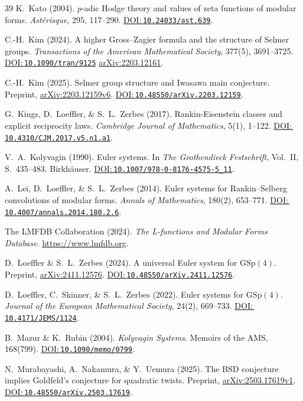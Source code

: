 \documentclass[aps,prd,twocolumn,superscriptaddress,nofootinbib,floatfix]{revtex4-2}
\newcommand{\doilink}[1]{\href{https://doi.org/#1}{DOI:\,\nolinkurl{#1}}}
\theoremstyle{definition}
\theoremstyle{remark}
\begin{document}
\begin{thebibliography}{39}
K.~Kato (2004).
$p$-adic Hodge theory and values of zeta functions of modular forms.
\textit{Astérisque}, 295, 117--290.
\doilink{10.24033/ast.639}.

C.-H.~Kim (2024).
A higher Gross--Zagier formula and the structure of Selmer groups.
\textit{Transactions of the American Mathematical Society}, 377(5), 3691--3725.
\doilink{10.1090/tran/9125} \href{https://arxiv.org/abs/2203.12161}{arXiv:2203.12161}.

C.-H.~Kim (2025).
Selmer group structure and Iwasawa main conjecture.
Preprint, \href{https://arxiv.org/abs/2203.12159v6}{arXiv:2203.12159v6}.
\doilink{10.48550/arXiv.2203.12159}.

G.~Kings, D.~Loeffler, \& S.~L.~Zerbes (2017).
Rankin-Eisenstein classes and explicit reciprocity laws.
\textit{Cambridge Journal of Mathematics}, 5(1), 1--122.
\doilink{10.4310/CJM.2017.v5.n1.a1}.

V.~A.~Kolyvagin (1990).
Euler systems.
In \textit{The Grothendieck Festschrift}, Vol.~II, S.\ 435--483. Birkhäuser.
\doilink{10.1007/978-0-8176-4575-5\_11}.

A.~Lei, D.~Loeffler, \& S.~L.~Zerbes (2014).
Euler systems for Rankin--Selberg convolutions of modular forms.
\textit{Annals of Mathematics}, 180(2), 653--771.
\doilink{10.4007/annals.2014.180.2.6}.

The LMFDB Collaboration (2024).
\textit{The L-functions and Modular Forms Database}.
\url{https://www.lmfdb.org}.

D.~Loeffler \& S.~L.~Zerbes (2024).
A universal Euler system for $\mathrm{GSp}(4)$.
Preprint, \href{https://arxiv.org/abs/2411.12576}{arXiv:2411.12576}.
\doilink{10.48550/arXiv.2411.12576}.

D.~Loeffler, C.~Skinner, \& S.~L.~Zerbes (2022).
Euler systems for $\mathrm{GSp}(4)$.
\textit{Journal of the European Mathematical Society}, 24(2), 669--733.
\doilink{10.4171/JEMS/1124}.

B.~Mazur \& K.~Rubin (2004).
\textit{Kolyvagin Systems}.
Memoirs of the AMS, 168(799).
\doilink{10.1090/memo/0799}.

N.~Murabayashi, A.~Nakamura, \& Y.~Uemura (2025).
The BSD conjecture implies Goldfeld's conjecture for quadratic twists.
Preprint, \href{https://arxiv.org/abs/2503.17619v1}{arXiv:2503.17619v1}.
\doilink{10.48550/arXiv.2503.17619}.


\end{thebibliography}
\end{document}
